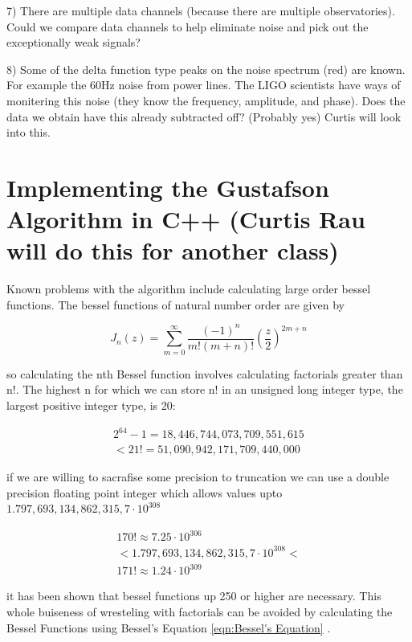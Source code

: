 \documentclass[twocolumn, groupedaddress]{revtex4-1}
\begin{document}
7) There are multiple data channels (because there are multiple observatories).  Could we compare data channels to help eliminate noise and pick out the exceptionally weak signals?

8) Some of the delta function type peaks on the noise spectrum (red) are known.  For example the 60Hz noise from power lines.  The LIGO scientists have ways of monitering this noise (they know the frequency, amplitude, and phase).  Does the data we obtain have this already subtracted off?  (Probably yes)  Curtis will look into this.

\section{Implementing the Gustafson Algorithm in C++ (Curtis Rau will do this for another class)}
Known problems with the algorithm include calculating large order bessel functions.  The bessel functions of natural number order are given by

\begin{equation}
J_n(z) = \sum_{m=0}^{\infty} \frac{(-1)^n}{m!(m+n)!} \left( \frac{z}{2} \right)^{2m+n}
\end{equation}

so calculating the nth Bessel function involves calculating factorials greater than n!.  The highest n for which we can store n! in an unsigned long integer type, the largest positive integer type, is 20:

\begin{align}
2^{64}-1 = 18,446,744,073,709,551,615 \\
< 21! = 51,090,942,171,709,440,000
\end{align}

if we are willing to sacrafise some precision to truncation we can use a double precision floating point integer which allows values upto $1.797,693,134,862,315,7 \cdot 10^{308}$

\begin{align}
170! \approx 7.25 \cdot 10^{306}				\\
< 1.797,693,134,862,315,7 \cdot 10^{308} < 	\\
171! \approx 1.24 \cdot 10^{309}
\end{align}

it has been shown that bessel functions up 250 or higher are necessary.  This whole buiseness of wresteling with factorials can be avoided by calculating the Bessel Functions using Bessel's Equation \ref{eqn:Bessel's Equation} \citep{folland}.
\end{document}
